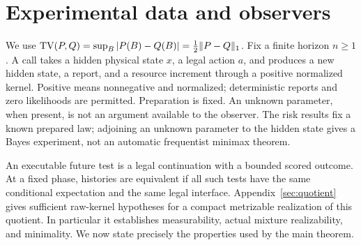 \section{Experimental data and observers}\label{sec:experiment}
We use $\operatorname{TV}(P,Q)=\sup_B|P(B)-Q(B)|=\frac12\|P-Q\|_1$. Fix a finite horizon $n\ge1$. A call takes a hidden physical state $x$, a legal action $a$, and produces a new hidden state, a report, and a resource increment through a positive normalized kernel. Positive means nonnegative and normalized; deterministic reports and zero likelihoods are permitted. Preparation is fixed. An unknown parameter, when present, is not an argument available to the observer. The risk results fix a known prepared law; adjoining an unknown parameter to the hidden state gives a Bayes experiment, not an automatic frequentist minimax theorem.

An executable future test is a legal continuation with a bounded scored outcome. At a fixed phase, histories are equivalent if all such tests have the same conditional expectation and the same legal interface. Appendix~\ref{sec:quotient} gives sufficient raw-kernel hypotheses for a compact metrizable realization of this quotient. In particular it establishes measurability, actual mixture realizability, and minimality. We now state precisely the properties used by the main theorem.

